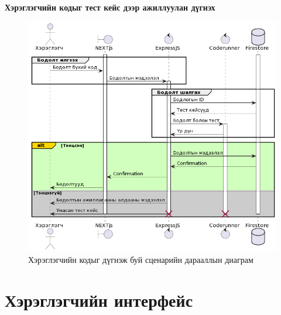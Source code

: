 \clearpage

\textbf{Хэрэглэгчийн кодыг тест кейс дээр ажиллуулан дүгнэх}
\begin{figure}[h]
  \centering
  \includegraphics[width=15cm]{img/diagrams/sequence.png}
  \caption{Хэрэглэгчийн кодыг дүгнэж буй сценарийн дарааллын диаграм}
\end{figure}

\clearpage

\section{Хэрэглэгчийн интерфейс}
